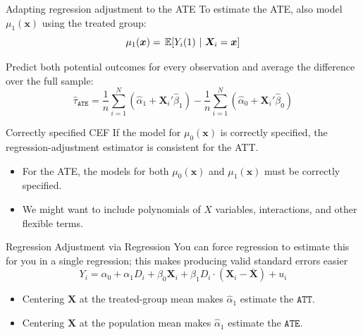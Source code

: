 \documentclass[aspectratio=169,t,11pt,table]{beamer}
\begin{document}
\begin{frame}{Adapting regression adjustment to the ATE}
  To estimate the ATE, also model $\mu_1(\bm{x})$ using the treated group:
  $$
    \mu_1(\bm{x}) = \expec{Y_i(1)}{\bm{X}_i = \bm{x}}
  $$

  \bigskip
  Predict both potential outcomes for every observation and average the difference over the full sample:
  $$
    \hat{\tau}_{\texttt{ATE}} =
    \frac{1}{n} \sum_{i=1}^N \left( \hat{\alpha}_1 + \bm{X}_i' \hat{\beta}_1 \right) -
    \frac{1}{n} \sum_{i=1}^N \left( \hat{\alpha}_0 + \bm{X}_i' \hat{\beta}_0 \right)
  $$
\end{frame}

\begin{frame}{Correctly specified CEF}
  If the model for $\mu_0(\bm{x})$ is correctly specified, the regression-adjustment estimator is consistent for the ATT.
  \begin{itemize}
    \item For the ATE, the models for both $\mu_0(\bm{x})$ and $\mu_1(\bm{x})$ must be correctly specified.
    \item We might want to include polynomials of $X$ variables, interactions, and other flexible terms.
  \end{itemize}
\end{frame}

%   

\begin{frame}{Regression Adjustment via Regression}
  You can force regression to estimate this for you in a single regression; this makes producing valid standard errors easier
  $$
    Y_i = \alpha_0 + \alpha_1 D_i + \beta_0 \bm{X}_i + \beta_1 D_i \cdot (\bm{X}_i - \bar{\bm{X}}) + u_i
  $$
  \begin{itemize}
    \item Centering $\bm{X}$ at the treated-group mean makes $\hat{\alpha}_1$ estimate the $\texttt{ATT}$.
    \item Centering $\bm{X}$ at the population mean makes $\hat{\alpha}_1$ estimate the $\texttt{ATE}$.
  \end{itemize}
\end{frame}
\end{document}
